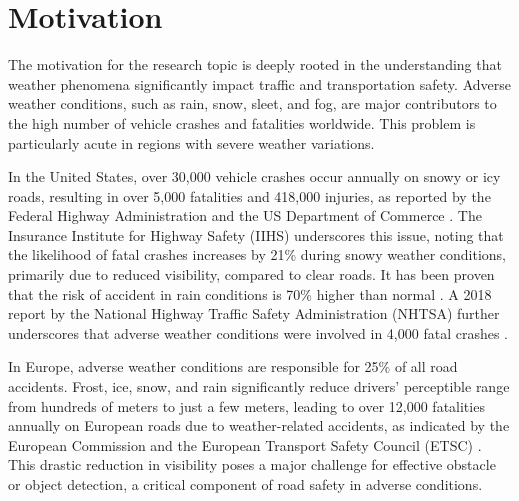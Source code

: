 \documentclass[report.tex]{subfiles}
\begin{document}
    
    \section{Motivation}

        The motivation for the research topic is deeply rooted in the understanding that weather phenomena significantly impact traffic and transportation safety. Adverse weather conditions, such as rain, snow, sleet, and fog, are major contributors to the high number of vehicle crashes and fatalities worldwide. This problem is particularly acute in regions with severe weather variations.

        In the United States, over 30,000 vehicle crashes occur annually on snowy or icy roads, resulting in over 5,000 fatalities and 418,000 injuries, as reported by the Federal Highway Administration \cite{federal-highway-administration-no-date} and the US Department of Commerce \cite{usDepartmentofCommerce2016}. The Insurance Institute for Highway Safety (IIHS) underscores this issue, noting that the likelihood of fatal crashes increases by 21\% during snowy weather conditions, primarily due to reduced visibility, compared to clear roads. It has been proven that the risk of accident in rain conditions is 70\% higher than normal \cite{andrey1993temporal}. A 2018 report by the National Highway Traffic Safety Administration (NHTSA) further underscores that adverse weather conditions were involved in 4,000 fatal crashes \cite{brumbelow2022light}.
        
        In Europe, adverse weather conditions are responsible for 25\% of all road accidents. Frost, ice, snow, and rain significantly reduce drivers' perceptible range from hundreds of meters to just a few meters, leading to over 12,000 fatalities annually on European roads due to weather-related accidents, as indicated by the European Commission and the European Transport Safety Council (ETSC) \cite{cookson-2022}. This drastic reduction in visibility poses a major challenge for effective obstacle or object detection, a critical component of road safety in adverse conditions.
\end{document}
